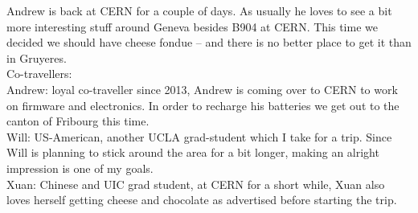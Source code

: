 Andrew is back at CERN for a couple of days. As usually he loves to see a bit more interesting stuff around Geneva besides B904 at CERN. This time we decided we should have cheese fondue -- and there is no better place to get it than in Gruyeres.\\

Co-travellers:\\
Andrew: loyal co-traveller since 2013, Andrew is coming over to CERN to work on firmware and electronics. In order to recharge his batteries we get out to the canton of Fribourg this time. \\

Will: US-American, another UCLA grad-student which I take for a trip. Since Will is planning to stick around the area for a bit longer, making an alright impression is one of my goals.\\

Xuan: Chinese and UIC grad student, at CERN for a short while, Xuan also loves herself getting cheese and chocolate as advertised before starting the trip.\\

